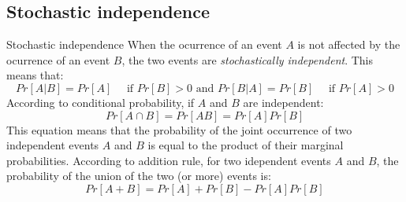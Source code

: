 \documentclass[8pt]{beamer}
\begin{document}
\subsection{Stochastic independence}
\begin{frame}{Stochastic independence}
    When the ocurrence of an event $A$ is not affected by the ocurrence of an event $B$, the two events are \emph{stochastically independent}. This means that:
    $$
    Pr[A | B] = Pr[A] \quad \text{ if } Pr[B] > 0 \text{ and } Pr[B | A] = Pr[B] \quad \text{ if } Pr[A] > 0
    $$
    According to conditional probability, if $A$ and $B$ are independent:
    $$
    Pr[A \cap B] = Pr[AB] = Pr[A] Pr[B]
    $$
    This equation means that the probability of the joint occurrence of two independent events $A$ and $B$ is equal to the product of their marginal probabilities. According to addition rule, for two idependent events $A$ and $B$, the probability of the union of the two (or more) events is:
    $$
    Pr[A + B] = Pr[A] + Pr[B] - Pr[A] Pr[B]
    $$
\end{frame}
\end{document}
